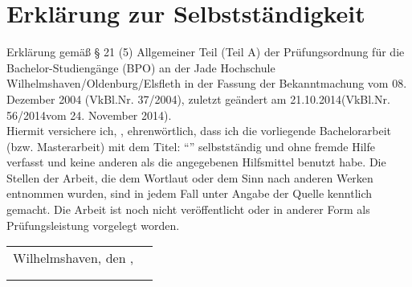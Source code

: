 \chapter*{Erklärung zur Selbstständigkeit}
Erklärung gemäß § 21 (5) Allgemeiner Teil (Teil A) der Prüfungsordnung für die Bachelor-Studiengänge (BPO) an der Jade Hochschule Wilhelmshaven/Oldenburg/Elsfleth in der Fassung der Bekanntmachung vom 08. Dezember 2004 (VkBl.Nr. 37/2004), zuletzt geändert am 21.10.2014(VkBl.Nr. 56/2014vom 24. November 2014).\\



Hiermit versichere ich, \thesisauthor, ehrenwörtlich, dass ich die vorliegende Bachelorarbeit (bzw. Masterarbeit) mit dem Titel: "`\thesistopic"' selbstständig und ohne fremde Hilfe verfasst und keine anderen als die angegebenen Hilfsmittel benutzt habe. Die Stellen der Arbeit, die dem Wortlaut oder dem Sinn nach anderen Werken entnommen wurden, sind in jedem Fall unter Angabe der Quelle kenntlich gemacht. Die Arbeit ist noch nicht veröffentlicht oder in anderer Form als Prüfungsleistung vorgelegt worden.

\vspace{1cm}

\renewcommand{\arraystretch}{0} %

\begin{flushright}
	\begin{tabular}{rr}
		Wilhelmshaven, den \thesistimehandin, & \hspace*{5cm}\\[0mm]
		\cline{2-2}\\[2mm]    %
		& \thesisauthor       %
	\end{tabular}
\end{flushright}

